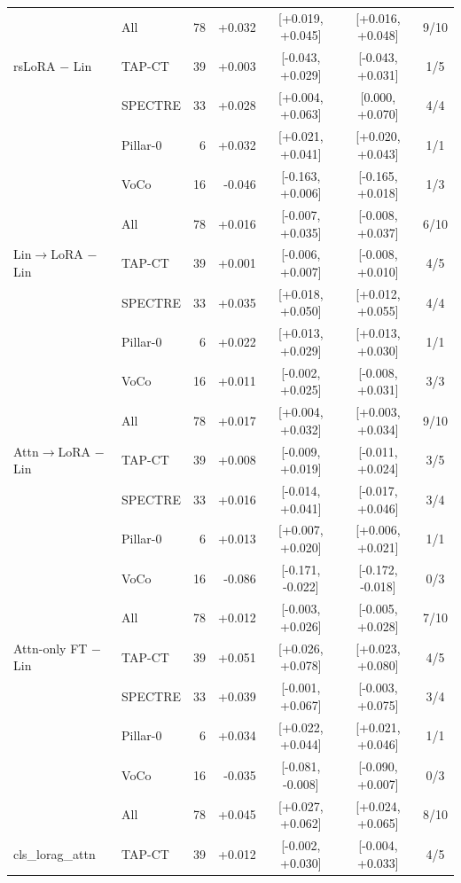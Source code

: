 \begin{tabular}{@{}llrrccc@{}}
 & All & 78 & +0.032 & [+0.019, +0.045] & [+0.016, +0.048] & 9/10 \\
\addlinespace[2pt]
rsLoRA $-$ Lin & TAP-CT & 39 & +0.003 & [-0.043, +0.029] & [-0.043, +0.031] & 1/5 \\
 & SPECTRE & 33 & +0.028 & [+0.004, +0.063] & [0.000, +0.070] & 4/4 \\
 & Pillar-0 & 6 & +0.032 & [+0.021, +0.041] & [+0.020, +0.043] & 1/1 \\
 & VoCo & 16 & -0.046 & [-0.163, +0.006] & [-0.165, +0.018] & 1/3 \\
 & All & 78 & +0.016 & [-0.007, +0.035] & [-0.008, +0.037] & 6/10 \\
\addlinespace[2pt]
Lin$\to$LoRA $-$ Lin & TAP-CT & 39 & +0.001 & [-0.006, +0.007] & [-0.008, +0.010] & 4/5 \\
 & SPECTRE & 33 & +0.035 & [+0.018, +0.050] & [+0.012, +0.055] & 4/4 \\
 & Pillar-0 & 6 & +0.022 & [+0.013, +0.029] & [+0.013, +0.030] & 1/1 \\
 & VoCo & 16 & +0.011 & [-0.002, +0.025] & [-0.008, +0.031] & 3/3 \\
 & All & 78 & +0.017 & [+0.004, +0.032] & [+0.003, +0.034] & 9/10 \\
\addlinespace[2pt]
Attn$\to$LoRA $-$ Lin & TAP-CT & 39 & +0.008 & [-0.009, +0.019] & [-0.011, +0.024] & 3/5 \\
 & SPECTRE & 33 & +0.016 & [-0.014, +0.041] & [-0.017, +0.046] & 3/4 \\
 & Pillar-0 & 6 & +0.013 & [+0.007, +0.020] & [+0.006, +0.021] & 1/1 \\
 & VoCo & 16 & -0.086 & [-0.171, -0.022] & [-0.172, -0.018] & 0/3 \\
 & All & 78 & +0.012 & [-0.003, +0.026] & [-0.005, +0.028] & 7/10 \\
\addlinespace[2pt]
Attn-only FT $-$ Lin & TAP-CT & 39 & +0.051 & [+0.026, +0.078] & [+0.023, +0.080] & 4/5 \\
 & SPECTRE & 33 & +0.039 & [-0.001, +0.067] & [-0.003, +0.075] & 3/4 \\
 & Pillar-0 & 6 & +0.034 & [+0.022, +0.044] & [+0.021, +0.046] & 1/1 \\
 & VoCo & 16 & -0.035 & [-0.081, -0.008] & [-0.090, +0.007] & 0/3 \\
 & All & 78 & +0.045 & [+0.027, +0.062] & [+0.024, +0.065] & 8/10 \\
\addlinespace[2pt]
cls\_lorag\_attn & TAP-CT & 39 & +0.012 & [-0.002, +0.030] & [-0.004, +0.033] & 4/5 \\

\end{tabular}
